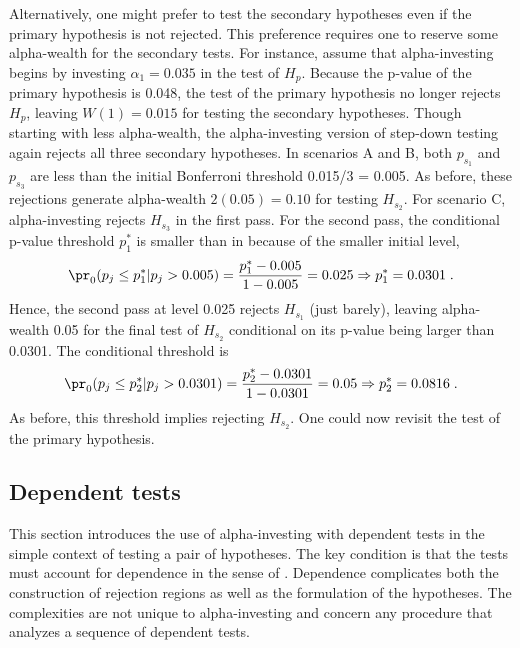 \documentclass[12pt]{article}
\begin{document}
 Alternatively, one might prefer to test the secondary hypotheses even if the
 primary hypothesis is not rejected.  This preference requires one to reserve
 some alpha-wealth for the secondary tests.  For instance, assume that
 alpha-investing begins by investing $\alpha_1 = 0.035$ in the test of $H_p$.
  Because the p-value of the primary hypothesis is 0.048, the test of the
 primary hypothesis no longer rejects $H_p$, leaving $W(1) = 0.015$ for testing
 the secondary hypotheses.  Though starting with less alpha-wealth, the
 alpha-investing version of step-down testing again rejects all three secondary
 hypotheses.  In scenarios A and B, both $p_{s_1}$ and $p_{s_3}$ are less than
 the initial Bonferroni threshold 0.015/3 = 0.005.  As before, these rejections
 generate alpha-wealth $2(0.05) = 0.10$ for testing $H_{s_2}$.  For scenario C,
 alpha-investing rejects $H_{s_3}$ in the first pass.  For the second pass, the
 conditional p-value threshold $p_1^{*}$ is smaller than in  because
 of the smaller initial level,
\begin{displaymath}
    \pr_0(p_j \le p_1^{*} | p_j > 0.005) 
        = \frac{p_1^{*} - 0.005}{1-0.005} = 0.025 
    \Rightarrow p_1^{*} = 0.0301 \;.
\end{displaymath}
 Hence, the second pass at level 0.025 rejects $H_{s_1}$ (just barely), leaving
 alpha-wealth 0.05 for the final test of $H_{s_2}$ conditional on its p-value
 being larger than 0.0301.  The conditional threshold is 
\begin{displaymath}
    \pr_0(p_j \le p_2^{*} | p_j > 0.0301) 
        = \frac{p_2^{*} - 0.0301}{1-0.0301} = 0.05 
    \Rightarrow p_2^{*} = 0.0816 \;.
\end{displaymath}
 As before, this threshold implies rejecting $H_{s_2}$.  One could now revisit
 the test of the primary hypothesis.


 \subsection{ Dependent tests }

 This section introduces the use of alpha-investing with dependent tests in the
 simple context of testing a pair of hypotheses.  The key condition is that the
 tests must account for dependence in the sense of .  Dependence
 complicates both the construction of rejection regions as well as the
 formulation of the hypotheses.  The complexities are not unique to
 alpha-investing and concern any procedure that analyzes a sequence of dependent
 tests.
\end{document}
